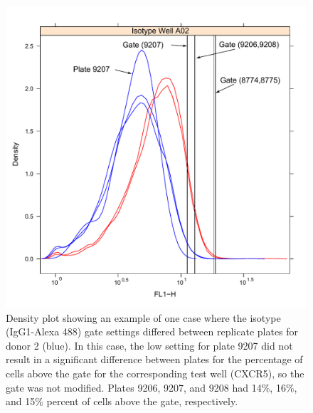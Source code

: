 \documentclass[12pt]{article}
\begin{document}
\begin{figure}
\centering
\includegraphics{isoplot.pdf}
\caption{Density plot showing an example of one case where the
isotype (IgG1-Alexa 488) gate settings differed between replicate plates for
donor 2 (blue). In this case, the low setting for plate 9207 did not result in a
significant difference between plates for the percentage of cells above the
gate for the corresponding test well (CXCR5), so the gate was not modified.
Plates 9206, 9207, and 9208 had 14\%, 16\%, and 15\% percent of cells above the
gate, respectively.}
\label{fig:isoPlot}
\end{figure}
\end{document}
